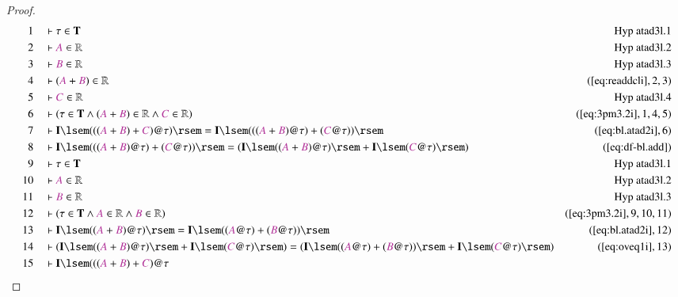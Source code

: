 \begin{proof}
\begin{align}
  1 &&  & \vdash \tau \in \mathbf{T}&\text{Hyp~atad3l.1}\notag%
  \\ 2 &&  & \vdash \mc{A} \in \mathbb{R}&\text{Hyp~atad3l.2}\notag%
  \\ 3 &&  & \vdash \mc{B} \in \mathbb{R}&\text{Hyp~atad3l.3}\notag%
  \\ 4 &&  & \vdash ( \mc{A} + \mc{B} ) \in
      \mathbb{R}&(\mbox{\ref{eq:readdcli}},2,3)\notag
  \\ 5 &&  & \vdash \mc{C} \in \mathbb{R}&\text{Hyp~atad3l.4}\notag%
  \\ 6 &&  & \vdash ( \tau \in \mathbf{T} \wedge ( \mc{A} + \mc{B} ) \in
      \mathbb{R} \wedge \mc{C} \in \mathbb{R}
      )&(\mbox{\ref{eq:3pm3.2i}},1,4,5)\notag
  \\ 7 &&  & \vdash \mathbf{I} \lsem ( ( ( \mc{A} + \mc{B} ) + \mc{C} ) @ \tau
      ) \rsem = \mathbf{I} \lsem ( ( ( \mc{A} + \mc{B} ) @
      \tau ) + ( \mc{C} @ \tau ) )
      \rsem&(\mbox{\ref{eq:bl.atad2i}},6)\notag
  \\ 8 &&  & \vdash \mathbf{I} \lsem ( ( ( \mc{A} + \mc{B} ) @ \tau ) + (
      \mc{C} @ \tau ) ) \rsem = ( \mathbf{I} \lsem ( (
      \mc{A} + \mc{B} ) @ \tau ) \rsem + \mathbf{I} \lsem (
      \mc{C} @ \tau ) \rsem
      )&(\mbox{\ref{eq:df-bl.add}})\notag
  \\ 9 &&  & \vdash \tau \in \mathbf{T}&\text{Hyp~atad3l.1}\notag%
  \\ 10 &&  & \vdash \mc{A} \in
      \mathbb{R}&\text{Hyp~atad3l.2}\notag%
  \\ 11 &&  & \vdash \mc{B} \in
      \mathbb{R}&\text{Hyp~atad3l.3}\notag%
  \\ 12 &&  & \vdash ( \tau \in \mathbf{T} \wedge \mc{A} \in \mathbb{R} \wedge
      \mc{B} \in \mathbb{R}
      )&(\mbox{\ref{eq:3pm3.2i}},9,10,11)\notag
  \\ 13 &&  & \vdash \mathbf{I} \lsem ( ( \mc{A} + \mc{B} ) @ \tau ) \rsem =
      \mathbf{I} \lsem ( ( \mc{A} @ \tau ) + ( \mc{B} @
      \tau ) ) \rsem&(\mbox{\ref{eq:bl.atad2i}},12)\notag
  \\ 14 &&  & \vdash ( \mathbf{I} \lsem ( ( \mc{A} + \mc{B} ) @ \tau ) \rsem +
      \mathbf{I} \lsem ( \mc{C} @ \tau ) \rsem ) = (
      \mathbf{I} \lsem ( ( \mc{A} @ \tau ) + ( \mc{B} @
      \tau ) ) \rsem + \mathbf{I} \lsem ( \mc{C} @ \tau )
      \rsem )&(\mbox{\ref{eq:oveq1i}},13)\notag
  \\ 15 &&  & \vdash \mathbf{I} \lsem ( ( ( \mc{A} + \mc{B} ) + \mc{C} ) @ \tau

\end{align}
\end{proof}
